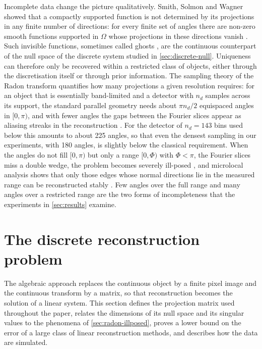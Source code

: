 \documentclass[11pt,a4paper]{article}
\numberwithin{equation}{section}
\theoremstyle{remark}
\begin{document}
Incomplete data change the picture qualitatively. Smith, Solmon and Wagner showed that a compactly supported function is not determined by its projections in any finite number of directions: for every finite set of angles there are non-zero smooth functions supported in $\Omega$ whose projections in these directions vanish \citep{smith1977}. Such invisible functions, sometimes called ghosts \citep{louis1984}, are the continuous counterpart of the null space of the discrete system studied in \cref{sec:discrete-null}. Uniqueness can therefore only be recovered within a restricted class of objects, either through the discretisation itself or through prior information. The sampling theory of the Radon transform quantifies how many projections a given resolution requires: for an object that is essentially band-limited and a detector with $n_d$ samples across its support, the standard parallel geometry needs about $\pi n_d/2$ equispaced angles in $[0,\pi)$, and with fewer angles the gaps between the Fourier slices appear as aliasing streaks in the reconstruction \citep{natterer2001,kak2001}. For the detector of $n_d=143$ bins used below this amounts to about 225 angles, so that even the densest sampling in our experiments, with 180 angles, is slightly below the classical requirement. When the angles do not fill $[0,\pi)$ but only a range $[0,\Phi)$ with $\Phi<\pi$, the Fourier slices miss a double wedge, the problem becomes severely ill-posed \citep{davison1983}, and microlocal analysis shows that only those edges whose normal directions lie in the measured range can be reconstructed stably \citep{quinto1993}. Few angles over the full range and many angles over a restricted range are the two forms of incompleteness that the experiments in \cref{sec:results} examine.

\section{The discrete reconstruction problem}\label{sec:discrete}

The algebraic approach replaces the continuous object by a finite pixel image and the continuous transform by a matrix, so that reconstruction becomes the solution of a linear system. This section defines the projection matrix used throughout the paper, relates the dimensions of its null space and its singular values to the phenomena of \cref{sec:radon-illposed}, proves a lower bound on the error of a large class of linear reconstruction methods, and describes how the data are simulated.
\end{document}
